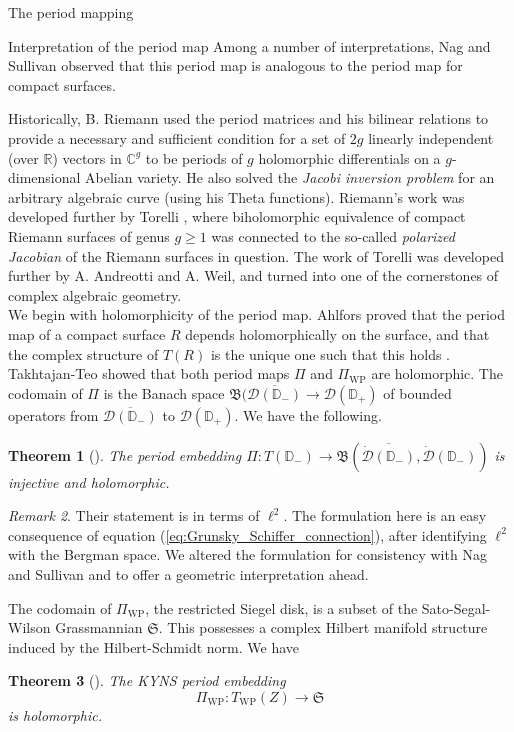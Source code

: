 \documentclass[12pt]{amsart}
\newcommand{\disk}{\ensuremath{\mathbb{D}} } %
\theoremstyle{plain}
\newtheorem{theorem}{Theorem}[section]
\theoremstyle{definition}
\theoremstyle{remark}
\newtheorem{remark}[theorem]{Remark}
\numberwithin{equation}{section} %
\numberwithin{figure}{section} %
\begin{document}
\begin{section}{The period mapping}
\begin{subsection}{Interpretation of the period map}
  Among a number of interpretations, Nag and Sullivan \cite{NagSullivan} observed that this period map is analogous to the period map for compact surfaces. 
 
  {Historically, B. Riemann \cite{Riemann} used the period matrices and his bilinear relations to provide a necessary and sufficient condition for a set of $2g$ linearly independent (over $\mathbb{R}$) vectors in $\mathbb{C}^{g}$ to be periods of $g$ holomorphic differentials on a $g$-dimensional Abelian variety. He also solved the {\it Jacobi inversion problem} for an arbitrary algebraic curve (using his Theta functions). Riemann's work was developed further by Torelli \cite{Torelli}, where biholomorphic equivalence of compact Riemann surfaces of genus $g\geq 1$ was connected to the so-called {\it polarized Jacobian} of the Riemann surfaces in question.}  
{The work of Torelli was developed further by A. Andreotti and A. Weil, and turned into one of the cornerstones of complex algebraic geometry.}\\

We begin with holomorphicity of the period map.
Ahlfors proved that the period map of a compact surface $R$ depends holomorphically on the surface, and that the complex structure of $T(R)$ is the unique one such that this holds \cite{Ahlfors_period}. Takhtajan-Teo \cite{Takhtajan_Teo_Memoirs} showed that both period maps $\Pi$ and $\Pi_{\mathrm{WP}}$ are holomorphic. 
  The codomain of $\Pi$ is 
  the Banach space $\mathfrak{B}(\overline{\mathcal{D}(\disk_-)} \rightarrow \mathcal{D}(\disk_+)$ of bounded operators from $\overline{\mathcal{D}(\disk_-)}$ to $\mathcal{D}(\disk_+)$. We have the following.
  \begin{theorem}[\cite{Takhtajan_Teo_Memoirs}] 
   \label{th:TT_period_Banach_holomorphic}
   The period      embedding $\Pi:T(\disk_-) \rightarrow \mathfrak{B}(\overline{\dot{\mathcal{D}}(\disk_-)},\dot{\mathcal{D}}(\disk_-))$
   is injective and holomorphic.
  \end{theorem}
  \begin{remark}
      Their statement is in terms of $\ell^2$. The formulation here is an easy consequence of equation (\ref{eq:Grunsky_Schiffer_connection}), after identifying $\ell^2$ with the Bergman space.  We altered the formulation for consistency with Nag and Sullivan \cite{NagSullivan} and to offer a geometric interpretation ahead.
  \end{remark}
   The codomain of $\Pi_{\mathrm{WP}}$, the restricted Siegel disk, is a subset of the {Sato}-Segal-Wilson Grassmannian $\mathfrak{S}$. This possesses a complex Hilbert manifold structure induced by the Hilbert-Schmidt norm.  We have 
  \begin{theorem}[\cite{Takhtajan_Teo_Memoirs}]  \label{th:TT_period_WP_holomorphic}
   The \emph{KYNS} period embedding
   \[ \Pi_{\mathrm{WP}}: T_{\mathrm{WP}}(Z) \rightarrow \mathfrak{S}  \]
   is holomorphic. 
  \end{theorem} 
  


\end{subsection}
\end{section}
\end{document}
